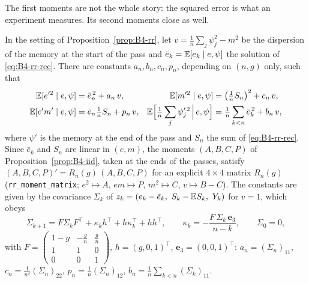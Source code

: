 The first moments are not the whole story: the squared error is what an experiment measures. Its second moments close as well.

\begin{proposition}\label{prop:B4-rr2}
In the setting of Proposition~\ref{prop:B4-rr}, let $v=\frac1n\sum_j\psi_j^2-m^2$ be the dispersion of the memory at the start of the pass and $\bar e_k=\mathbb{E}[e_k\mid e,\psi]$ the solution of \eqref{eq:B4-rr-rec}. There are constants $a_n,b_n,c_n,p_n$, depending on $(n,g)$ only, such that
\begin{equation}\label{eq:B4-rr2}
\begin{aligned}
\mathbb{E}[e'^2\mid e,\psi]&=\bar e_n^{\,2}+a_n\,v, & \mathbb{E}[m'^2\mid e,\psi]&=\big(\tfrac1nS_n\big)^2+c_n\,v,\\
\mathbb{E}[e'm'\mid e,\psi]&=\bar e_n\tfrac1nS_n+p_n\,v, & \mathbb{E}\Big[\tfrac1n\sum_j\psi_j'^{\,2}\,\Big|\,e,\psi\Big]&=\tfrac1n\sum_{k<n}\bar e_k^{\,2}+b_n\,v ,
\end{aligned}
\end{equation}
where $\psi'$ is the memory at the end of the pass and $S_n$ the sum of \eqref{eq:B4-rr-rec}. Since $\bar e_k$ and $S_n$ are linear in $(e,m)$, the moments $(A,B,C,P)$ of Proposition~\ref{prop:B4-iid}, taken at the ends of the passes, satisfy $(A,B,C,P)'=R_n(g)\,(A,B,C,P)$ for an explicit $4\times4$ matrix $R_n(g)$ (\texttt{rr\_moment\_matrix}; $e^2\mapsto A$, $em\mapsto P$, $m^2\mapsto C$, $v\mapsto B-C$). The constants are given by the covariance $\Sigma_k$ of $z_k=(e_k-\bar e_k,\ S_k-\E S_k,\ Y_k)$ for $v=1$, which obeys
\begin{equation}\label{eq:B4-rr2-cov}
\Sigma_{k+1}=F\Sigma_kF^\top+\kappa_kh^\top+h\kappa_k^\top+hh^\top,\qquad \kappa_k=-\frac{F\,\Sigma_k\,\mathbf e_3}{n-k},\qquad \Sigma_0=0,
\end{equation}
with $F=\begin{pmatrix}1-g&-\frac gn&\frac gn\\1&1&0\\0&0&1\end{pmatrix}$, $h=(g,0,1)^\top$, $\mathbf e_3=(0,0,1)^\top$: $a_n=(\Sigma_n)_{11}$, $c_n=\frac1{n^2}(\Sigma_n)_{22}$, $p_n=\frac1n(\Sigma_n)_{12}$, $b_n=\frac1n\sum_{k<n}(\Sigma_k)_{11}$.
\end{proposition}
